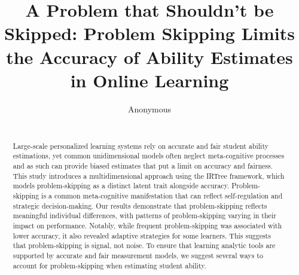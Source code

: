 \documentclass{edm_article}
\begin{document}
 



\title{A Problem that Shouldn't be Skipped: Problem Skipping Limits the Accuracy of Ability Estimates in Online Learning}

\author{
Anonymous\\
       \affaddr{}\\
       \email{}
}

\maketitle

\begin{abstract}
Large-scale personalized learning systems rely on accurate and fair student ability estimations, yet common unidimensional models often neglect meta-cognitive processes and as such can provide biased estimates that put a limit on accuracy and fairness. This study introduces a multidimensional approach using the IRTree framework, which models problem-skipping as a distinct latent trait alongside accuracy. Problem-skipping is a common meta-cognitive manifestation that can reflect self-regulation and strategic decision-making. Our results demonstrate that problem-skipping reflects meaningful individual differences, with patterns of problem-skipping varying in their impact on performance. Notably, while frequent problem-skipping was associated with lower accuracy, it also revealed adaptive strategies for some learners. This suggests that problem-skipping is signal, not noise. To ensure that learning analytic tools are supported by accurate and fair measurement models, we suggest several ways to account for problem-skipping when estimating student ability. 
      
\end{abstract}

\end{document}
